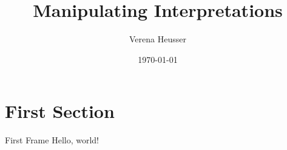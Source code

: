 \documentclass{beamer}
\title{Manipulating Interpretations}
\date{\today}
\author{Verena Heusser}
\institute{Intellisec KIT}
\begin{document}
  \maketitle
  \section{First Section}
  \begin{frame}{First Frame}
    Hello, world!
  \end{frame}
\end{document}

